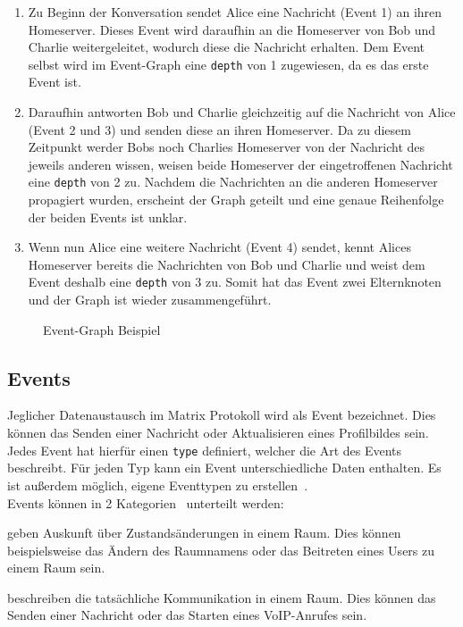     \begin{enumerate}[label={(\arabic*)}]
    \item Zu Beginn der Konversation sendet Alice eine Nachricht (Event 1) an ihren Homeserver.
    Dieses Event wird daraufhin an die Homeserver von Bob und Charlie weitergeleitet, wodurch diese die Nachricht erhalten.
    Dem Event selbst wird im Event-Graph eine \texttt{depth} von 1 zugewiesen, da es das erste Event ist.
    \item Daraufhin antworten Bob und Charlie gleichzeitig auf die Nachricht von Alice (Event 2 und 3) und senden diese an ihren Homeserver.
    Da zu diesem Zeitpunkt werder Bobs noch Charlies Homeserver von der Nachricht des jeweils anderen wissen, weisen beide Homeserver der eingetroffenen Nachricht eine \texttt{depth} von 2 zu.
    Nachdem die Nachrichten an die anderen Homeserver propagiert wurden, erscheint der Graph geteilt und eine genaue Reihenfolge der beiden Events ist unklar.
    \item Wenn nun Alice eine weitere Nachricht (Event 4) sendet, kennt Alices Homeserver bereits die Nachrichten von Bob und Charlie und weist dem Event deshalb eine \texttt{depth} von 3 zu.
    Somit hat das Event zwei Elternknoten und der Graph ist wieder zusammengeführt.
    \end{enumerate}

\begin{figure}[h]
    \centering
    
    \caption{Event-Graph Beispiel}
    \label{fig:events}
\end{figure}

    \newpage
    \subsection{Events}\label{sec:events}
    Jeglicher Datenaustausch im Matrix Protokoll wird als Event bezeichnet.
    Dies können das Senden einer Nachricht oder Aktualisieren eines Profilbildes sein.
    Jedes Event hat hierfür einen \texttt{type} definiert, welcher die Art des Events beschreibt.
    Für jeden Typ kann ein Event unterschiedliche Daten enthalten.
    Es ist außerdem möglich, eigene Eventtypen zu erstellen~\cite{events}.\\
    Events können in 2 Kategorien~\cite{roomevents} unterteilt werden:
    \begin{description}[leftmargin=!,labelwidth=3.5cm]
        \item [State events] geben Auskunft über Zustandsänderungen in einem Raum. Dies können beispielsweise das Ändern des Raumnamens oder das Beitreten eines Users zu einem Raum sein.
        \item [Message events] beschreiben die tatsächliche Kommunikation in einem Raum. Dies können das Senden einer Nachricht oder das Starten eines VoIP-Anrufes sein.
    \end{description}

